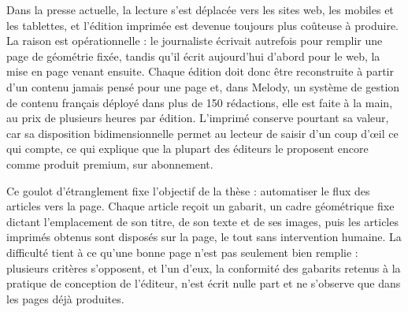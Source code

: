 \begin{ResumeMotsCles}
\begin{abstract}
As a final contribution, the same re-layouting principles are repurposed for a societal problem: reading under constrained visual access. In a controlled study with 24 participants, including readers with low vision, automatically generated direct-access large-print editions were compared with gesture-based magnification. Completion times fell by 37\% when reading headlines and by 50\% when locating a target headline, the larger gains going to readers with low vision. More importantly, pan-and-zoom deflects the reading path away from the trajectory the page affords, which the large-print edition preserves.

Validated on production data from a deployed industrial system, where the proposed methods now run as pilots, this work shows that automated page layout generation can both remove a costly editorial bottleneck and widen access to the two-dimensional reading experience. Its components open further industrial applications, other display formats, broader user validation, and closer editor involvement in the optimization.
\end{abstract}


\begin{resume}
Dans la presse actuelle, la lecture s'est déplacée vers les sites web, les mobiles et les tablettes, et l'édition imprimée est devenue toujours plus coûteuse à produire. La raison est opérationnelle : le journaliste écrivait autrefois pour remplir une page de géométrie fixée, tandis qu'il écrit aujourd'hui d'abord pour le web, la mise en page venant ensuite. Chaque édition doit donc être reconstruite à partir d'un contenu jamais pensé pour une page et, dans Melody, un système de gestion de contenu français déployé dans plus de 150 rédactions, elle est faite à la main, au prix de plusieurs heures par édition. L'imprimé conserve pourtant sa valeur, car sa disposition bidimensionnelle permet au lecteur de saisir d'un coup d'{\oe}il ce qui compte, ce qui explique que la plupart des éditeurs le proposent encore comme produit premium, sur abonnement.

Ce goulot d'étranglement fixe l'objectif de la thèse : automatiser le flux des articles vers la page. Chaque article reçoit un gabarit, un cadre géométrique fixe dictant l'emplacement de son titre, de son texte et de ses images, puis les articles imprimés obtenus sont disposés sur la page, le tout sans intervention humaine. La difficulté tient à ce qu'une bonne page n'est pas seulement bien remplie : plusieurs critères s'opposent, et l'un d'eux, la conformité des gabarits retenus à la pratique de conception de l'éditeur, n'est écrit nulle part et ne s'observe que dans les pages déjà produites.


\end{resume}
\end{ResumeMotsCles}
